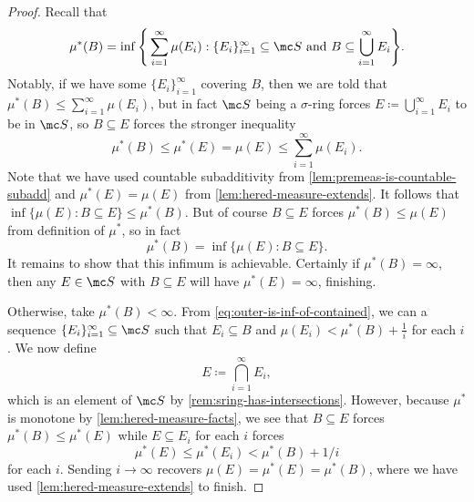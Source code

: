 \documentclass[../notes.tex]{subfiles}
\begin{document}
\begin{proof}
	Recall that
	\[\mu^*(B)=\inf\Bigg\{\sum_{i=1}^\infty\mu(E_i):\{E_i\}_{i=1}^\infty\subseteq\mc S\text{ and }B\subseteq\bigcup_{i=1}^\infty E_i\Bigg\}.\]
	Notably, if we have some $\{E_i\}_{i=1}^\infty$ covering $B$, then we are told that $\mu^*(B)\le\sum_{i=1}^\infty\mu(E_i)$, but in fact $\mc S$ being a $\sigma$-ring forces $E\coloneqq\bigcup_{i=1}^\infty E_i$ to be in $\mc S$, so $B\subseteq E$ forces the stronger inequality
	\[\mu^*(B)\le\mu^*(E)=\mu(E)\le\sum_{i=1}^\infty\mu(E_i).\]
	Note that we have used countable subadditivity from \autoref{lem:premeas-is-countable-subadd} and $\mu^*(E)=\mu(E)$ from \autoref{lem:hered-measure-extends}. It follows that $\inf\{\mu(E):B\subseteq E\}\le\mu^*(B)$. But of course $B\subseteq E$ forces $\mu^*(B)\le\mu(E)$ from definition of $\mu^*$, so in fact
	\begin{equation}
		\mu^*(B)=\inf\{\mu(E):B\subseteq E\}. \label{eq:outer-is-inf-of-contained}
	\end{equation}
	It remains to show that this infimum is achievable. Certainly if $\mu^*(B)=\infty$, then any $E\in\mc S$ with $B\subseteq E$ will have $\mu^*(E)=\infty$, finishing.

	Otherwise, take $\mu^*(B)<\infty$. From \autoref{eq:outer-is-inf-of-contained}, we can a sequence $\{E_i\}_{i=1}^\infty\subseteq\mc S$ such that $E_i\subseteq B$ and $\mu(E_i)<\mu^*(B)+\frac1i$ for each $i$. We now define
	\[E\coloneqq\bigcap_{i=1}^\infty E_i,\]
	which is an element of $\mc S$ by \autoref{rem:sring-has-intersections}. However, because $\mu^*$ is monotone by \autoref{lem:hered-measure-facts}, we see that $B\subseteq E$ forces $\mu^*(B)\le\mu^*(E)$ while $E\subseteq E_i$ for each $i$ forces
	\[\mu^*(E)\le\mu^*(E_i)<\mu^*(B)+1/i\]
	for each $i$. Sending $i\to\infty$ recovers $\mu(E)=\mu^*(E)=\mu^*(B)$, where we have used \autoref{lem:hered-measure-extends} to finish.
\end{proof}
\end{document}
